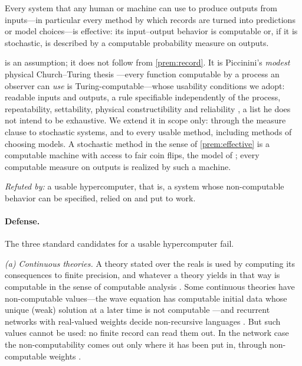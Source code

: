 \begin{premise}\label{prem:effective}
Every system that any human or machine can use to produce outputs from inputs---in
particular every method by which records are turned into predictions or model
choices---is effective: its input--output behavior is computable or, if it is
stochastic, is described by a computable probability measure on outputs.
\end{premise}

 is an assumption; it does not follow from \cref{prem:record}.
It is Piccinini's \emph{modest} physical Church--Turing thesis
\citep{piccinini2011,piccinini2015}---every function computable by a process an
observer can \emph{use} is Turing-computable---whose usability conditions we adopt:
readable inputs and outputs, a rule specifiable independently of the process,
repeatability, settability, physical constructibility and reliability
\citep{piccinini2015}, a list he does not intend to be exhaustive. We extend it
in scope only: through the measure clause to stochastic systems, and to every usable
method, including methods of choosing models.
A stochastic method in the sense of \cref{prem:effective} is a computable machine with
access to fair coin flips, the model of \citet{pitt1989}; every computable measure on
outputs is realized by such a machine.

\emph{Refuted by:} a usable hypercomputer, that is, a system whose non-computable
behavior can be specified, relied on and put to work.

\paragraph{Defense.} The three standard candidates for a usable hypercomputer fail.

\emph{(a) Continuous theories.} A theory stated over the reals is used by computing
its consequences to finite precision, and whatever a theory yields in that way is
computable in the sense of computable analysis \citep{weihrauch2000}. Some
continuous theories have non-computable values---the wave equation has computable
initial data whose unique (weak) solution at a later time is not computable
\citep{pourel-richards1981}---and recurrent networks with real-valued weights decide
non-recursive languages \citep{siegelmann-sontag1994}. But such values cannot be
used: no finite record can read them out. In the network case the non-computability
comes out only where it has been put in, through non-computable weights
\citep{davis2004}.

